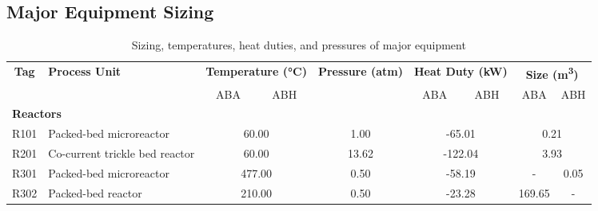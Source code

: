 

\subsection{Major Equipment Sizing}
\begin{table}[H]
\centering
    \caption{Sizing, temperatures, heat duties, and pressures of major equipment}
    \label{tab:equipment sizing}\footnotesize
\begin{tabular}{cllccccccc}
\toprule
\textbf{Tag}          & \multicolumn{2}{l}{\textbf{Process Unit}}          & \multicolumn{2}{c}{\textbf{Temperature (°C)}} & \textbf{Pressure (atm)} & \multicolumn{2}{c}{\textbf{Heat Duty (kW)}} & \multicolumn{2}{c}{\textbf{Size (\si{\cubic\m})}}  \\ \cmidrule(lr){4-5} \cmidrule(l){7-8} \cmidrule(l){9-10} 
                      &                                    &               & ABA                    & ABH                    &                         & ABA                   & ABH                   & ABA                           & ABH          \\ \midrule
\multicolumn{10}{l}{\textbf{Reactors}}                                                                                                                                                                                                          \\
R101                  & \multicolumn{2}{l}{Packed-bed microreactor}        & \multicolumn{2}{c}{60.00}                     & 1.00                    & \multicolumn{2}{c}{-65.01}                  & \multicolumn{2}{c}{0.21}                   \\
R201                  & \multicolumn{2}{l}{Co-current trickle bed reactor} & \multicolumn{2}{c}{60.00}                     & 13.62                   & \multicolumn{2}{c}{-122.04}                 & \multicolumn{2}{c}{3.93}                   \\
R301                  & \multicolumn{2}{l}{Packed-bed microreactor}        & \multicolumn{2}{c}{477.00}                    & 0.50                    & \multicolumn{2}{c}{-58.19}                  & -                            & 0.05        \\
R302                  & \multicolumn{2}{l}{Packed-bed reactor}             & \multicolumn{2}{c}{210.00}                    & 0.50                    & \multicolumn{2}{c}{-23.28}                  & 169.65                       & -           \\

\end{tabular}
\end{table}
